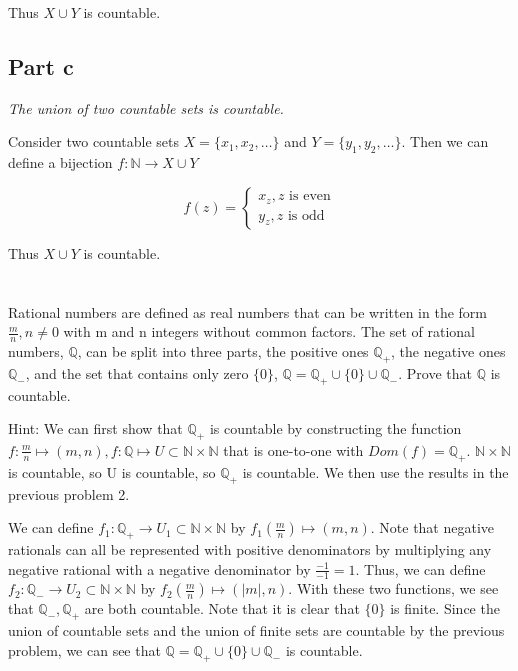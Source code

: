 \documentclass[]{article}
\newcommand{\naturals}{\mathbb{N}}
\newcommand{\rationals}{\mathbb{Q}}
\begin{document}
			Thus $X \cup Y$ is countable. 
		\subsection*{Part c}
			\emph{The union of two countable sets is countable.}

			Consider two countable sets $X = \{x_1, x_2, \ldots\}$ and $Y = \{y_1, y_2, \ldots\}$. Then we can define a bijection $f : \naturals \to X \cup Y$

			\[f(z) = \begin{cases}
				x_z, z \text{ is even} \\
				y_z, z \text{ is odd}
			\end{cases}\]

			Thus $X \cup Y$ is countable. 

	\section{}
		\begin{em}
			Rational numbers are defined as real numbers that can be written in the form $\frac{m}{n}, n \neq 0$ with m and n integers without common factors. The set of rational numbers, $\rationals$, can be split into three parts, the positive ones $\rationals_+$, the negative ones $\rationals_-$, and the set that contains only zero $\{0\}$, $\rationals = \rationals_+ \cup \{0\} \cup \rationals_-$. Prove that $\rationals$ is countable.

			Hint: We can first show that $\rationals_+$ is countable by constructing the function $f : \frac{m}{n} \mapsto (m, n), f : \rationals \mapsto U \subset \naturals \times \naturals$ that is one-to-one with $Dom(f) = \rationals_+$. $\naturals \times \naturals$ is countable, so U is countable, so $\rationals_+$ is countable. We then use the results in the previous problem 2. 
		\end{em}

		We can define $f_1 : \rationals_+ \to U_1 \subset \naturals \times \naturals$ by $f_1(\frac{m}{n}) \mapsto (m, n)$. Note that negative rationals can all be represented with positive denominators by multiplying any negative rational with a negative denominator by $\frac{-1}{-1} = 1$. Thus, we can define $f_2 : \rationals_- \to U_2 \subset \naturals \times \naturals$ by $f_2(\frac{m}{n}) \mapsto (|m|,n)$. With these two functions, we see that $\rationals_-, \rationals_+$ are both countable. Note that it is clear that $\{0\}$ is finite. Since the union of countable sets and the union of finite sets are countable by the previous problem, we can see that $\rationals = \rationals_+ \cup \{0\} \cup \rationals_-$ is countable.
\end{document}
